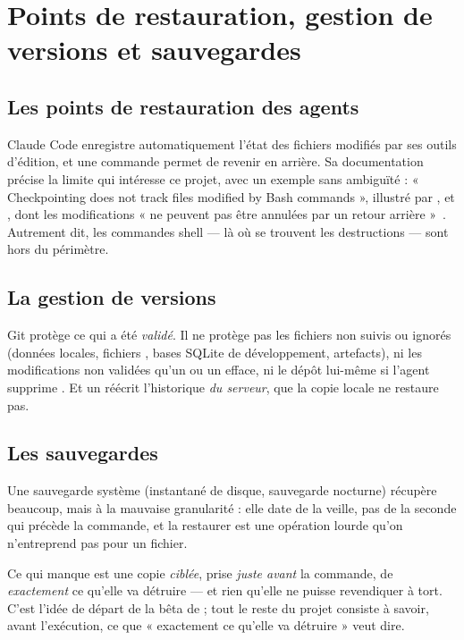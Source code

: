\section{Points de restauration, gestion de versions et sauvegardes}
\label{sec:restauration}

\subsection{Les points de restauration des agents}
Claude Code enregistre automatiquement l'état des fichiers modifiés par ses outils
d'édition, et une commande  permet de revenir en arrière. Sa documentation
précise la limite qui intéresse ce projet, avec un exemple sans ambiguïté :
« Checkpointing does not track files modified by Bash commands », illustré par
,  et , dont les
modifications « ne peuvent pas être annulées par un retour arrière »~\cite{cc-checkpointing}.
Autrement dit, les commandes shell --- là où se trouvent les destructions --- sont hors du
périmètre.

\subsection{La gestion de versions}
Git protège ce qui a été \emph{validé}. Il ne protège pas les fichiers non suivis ou
ignorés (données locales, fichiers , bases SQLite de développement, artefacts),
ni les modifications non validées qu'un  ou un 
efface, ni le dépôt lui-même si l'agent supprime . Et un  réécrit l'historique \emph{du serveur}, que la copie locale ne restaure pas.

\subsection{Les sauvegardes}
Une sauvegarde système (instantané de disque, sauvegarde nocturne) récupère beaucoup, mais
à la mauvaise granularité : elle date de la veille, pas de la seconde qui précède la
commande, et la restaurer est une opération lourde qu'on n'entreprend pas pour un fichier.

\begin{pourquoi}
Ce qui manque est une copie \emph{ciblée}, prise \emph{juste avant} la commande, de
\emph{exactement} ce qu'elle va détruire --- et rien qu'elle ne puisse revendiquer à tort.
C'est l'idée de départ de la bêta de \demo{} ; tout le reste du projet consiste à savoir,
avant l'exécution, ce que « exactement ce qu'elle va détruire » veut dire.
\end{pourquoi}
